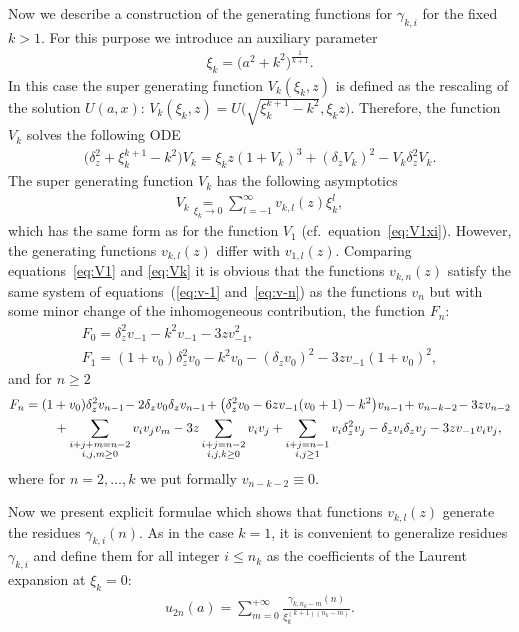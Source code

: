 \documentclass[pdftex]{sigma}
\numberwithin{equation}{section}
\begin{document}
Now we describe a construction of the generating functions for $\gamma_{k,i}$ for the fixed $k>1$. For this purpose we introduce
an auxiliary parameter
\begin{gather*}
\xi_k=\big(a^2+k^2\big)^{\frac{1}{k+1}}.
\end{gather*}
In this case the super generating function $V_k(\xi_k,z)$ is defined as the rescaling of the solution $U(a,x)$:
$V_k(\xi_k,z)=U\big(\sqrt{\xi_k^{k+1}-k^2},\xi_k z\big)$.
Therefore, the function $V_k$ solves the following ODE
\begin{gather}\label{eq:Vk}
\big(\delta_z^2+\xi_k^{k+1}-k^2\big)V_k=\xi_k z(1+V_k)^3+(\delta_zV_k)^2-V_k\delta_z^2V_k.
\end{gather}
The super generating function $V_k$ has the following asymptotics
\begin{gather}\label{eq:Vkxi}
V_k\underset{\xi_k\to 0}=\sum\limits_{l=-1}^\infty v_{k,l}(z)\xi_k^l,
\end{gather}
which has the same form as for the function $V_1$ (cf.\ equation~\eqref{eq:V1xi}). However, the generating functions
$v_{k,l}(z)$ differ with $v_{1,l}(z)$. Comparing equations~\eqref{eq:V1} and \eqref{eq:Vk} it is obvious that the
functions $v_{k,n}(z)$ satisfy the same system of equations~(\eqref{eq:v-1} and~\eqref{eq:v-n})
as the functions $v_n$ but with some minor change of the inhomogeneous contribution, the function $F_n$:
\begin{gather}
F_0 =\delta_z^2v_{-1}-k^2v_{-1}-3zv_{-1}^2,\label{eq:F0k}\\
F_1 =(1+v_0)\delta_z^2v_0-k^2v_0-(\delta_zv_0)^2-3zv_{-1}(1+v_0)^2,\label{eq:F1k}
\end{gather}
and for $n\geq2$
\begin{gather}
F_n =(1+v_0)\delta_z^2v_{n-1}\! -2\delta_zv_0\delta_zv_{n-1}\! + \big(\delta_z^2v_0-6zv_{-1}(v_0+1)-k^2\big)v_{n-1}\!
+v_{n-k-2}\! -3zv_{n-2}\nonumber\\
\hphantom{F_n =}{}+\sum_{\substack{i+j+m=n-2\\i,j,m\geq0}} v_iv_jv_m-3z\sum_{\substack{i+j=n-2\\i,j,k\geq0}}v_iv_j+
\sum_{\substack{i+j=n-1\\i,j\geq1}}v_i\delta_z^2v_j-\delta_zv_i\delta_zv_j-3zv_{-1}v_iv_j,\!\!\!\label{eq:Fnk}
\end{gather}
where for $n=2,\ldots, k$ we put formally $v_{n-k-2}\equiv0$.

Now we present explicit formulae which shows that functions $v_{k,l}(z)$ generate the resi\-dues $\gamma_{k,i}(n)$.
As in the case $k=1$, it is convenient to generalize residues $\gamma_{k,i}$ and define them for all integer $i\leq n_k$
as the coefficients of the Laurent expansion at $\xi_k=0$:
\begin{gather}\label{eq:def-junior-gamma-k}
u_{2n}(a)=\sum\limits_{m=0}^{+\infty}\frac{\gamma_{k,n_k-m}(n)}{\xi_k^{(k+1)(n_k-m)}}.
\end{gather}
\end{document}
